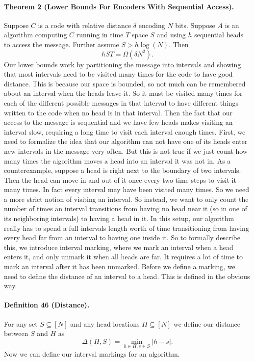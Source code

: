 \paragraph{Theorem 2 (Lower Bounds For Encoders With Sequential Access).} Suppose $C$ is a code with relative distance $\delta$ encoding $N$ bits. Suppose $A$ is an algorithm computing $C$ running in time $T$ space $S$ and using $h$ sequential heads to access the message. Further assume $S>h\log(N)$. Then
\[hST=\Omega(\delta N^2).\]
Our lower bounds work by partitioning the message into intervals and showing that most intervals need to be visited many times for the code to have good distance. This is because our space is bounded, so not much can be remembered about an interval when the heads leave it. So it must be visited many times for each of the different possible messages in that interval to have different things written to the code when no head is in that interval. Then the fact that our access to the message is sequential and we have few heads makes visiting an interval slow, requiring a long time to visit each interval enough times.
First, we need to formalize the idea that our algorithm can not have one of its heads enter new intervals in the message very often. But this is not true if we just count how many times the algorithm moves a head into an interval it was not in. As a counterexample, suppose a head is right next to the boundary of two intervals. Then the head can move in and out of it once every two time steps to visit it many times. In fact every interval may have been visited many times. So we need a more strict notion of visiting an interval.
So instead, we want to only count the number of times an interval transitions from having no head near it (so in one of its neighboring intervals) to having a head in it. In this setup, our algorithm really has to spend a full intervals length worth of time transitioning from having every head far from an interval to having one inside it. So to formally describe this, we introduce interval marking, where we mark an interval when a head enters it, and only unmark it when all heads are far. It requires a lot of time to mark an interval after it has been unmarked.
Before we define a marking, we need to define the distance of an interval to a head. This is defined in the obvious way.
\paragraph{Definition 46 (Distance).} For any set $S\subseteq[N]$ and any head locations $H\subseteq[N]$ we define our distance between $S$ and $H$ as
\[\Delta(H,S)=\min_{h\in H,s\in S}|h-s|.\]
Now we can define our interval markings for an algorithm.
